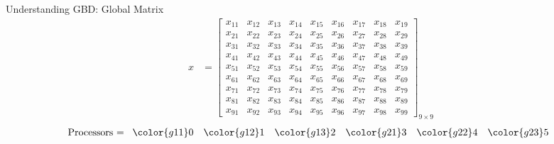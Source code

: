 \begin{frame}
\begin{exampleblock}{Understanding GBD:  Global Matrix}
\begin{align*}
x &= \left[
      \begin{array}{lllllllll}
      x_{11} & x_{12} & x_{13} & x_{14} & x_{15} & x_{16} & x_{17} & x	_{18} & x_{19}\\
      x_{21} & x_{22} & x_{23} & x_{24} & x_{25} & x_{26} & x_{27} & x	_{28} & x_{29}\\
      x_{31} & x_{32} & x_{33} & x_{34} & x_{35} & x_{36} & x_{37} & x	_{38} & x_{39}\\
      x_{41} & x_{42} & x_{43} & x_{44} & x_{45} & x_{46} & x_{47} & x	_{48} & x_{49}\\
      x_{51} & x_{52} & x_{53} & x_{54} & x_{55} & x_{56} & x_{57} & x	_{58} & x_{59}\\
      x_{61} & x_{62} & x_{63} & x_{64} & x_{65} & x_{66} & x_{67} & x	_{68} & x_{69}\\
      x_{71} & x_{72} & x_{73} & x_{74} & x_{75} & x_{76} & x_{77} & x	_{78} & x_{79}\\
      x_{81} & x_{82} & x_{83} & x_{84} & x_{85} & x_{86} & x_{87} & x	_{88} & x_{89}\\
      x_{91} & x_{92} & x_{93} & x_{94} & x_{95} & x_{96} & x_{97} & x	_{98} & x_{99}
      \end{array}
\right]_{9\times 9}
\end{align*}
\begin{align*}
\text{Processors = }
      \begin{array}{llllll}
      \color{g11}0 & \color{g12}1 & \color{g13}2 & \color{g21}3 & \color{g22}4 & \color{g23}5
      \end{array}
\end{align*}
\end{exampleblock}
\end{frame}


